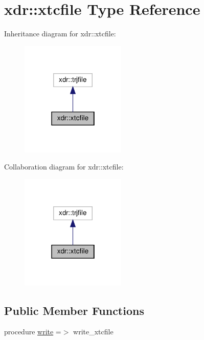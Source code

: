 \hypertarget{structxdr_1_1xtcfile}{}\section{xdr\+:\+:xtcfile Type Reference}
\label{structxdr_1_1xtcfile}


Inheritance diagram for xdr\+:\+:xtcfile\+:
\nopagebreak
\begin{figure}[H]
\begin{center}
\leavevmode
\includegraphics[width=142pt]{structxdr_1_1xtcfile__inherit__graph}
\end{center}
\end{figure}


Collaboration diagram for xdr\+:\+:xtcfile\+:
\nopagebreak
\begin{figure}[H]
\begin{center}
\leavevmode
\includegraphics[width=142pt]{structxdr_1_1xtcfile__coll__graph}
\end{center}
\end{figure}
\subsection*{Public Member Functions}
\begin{DoxyCompactItemize}
\item 
procedure \hyperlink{structxdr_1_1xtcfile_ac2af78519ced579714c7ffe4f15f5d46}{write} =$>$ write\+\_\+xtcfile
\end{DoxyCompactItemize}
